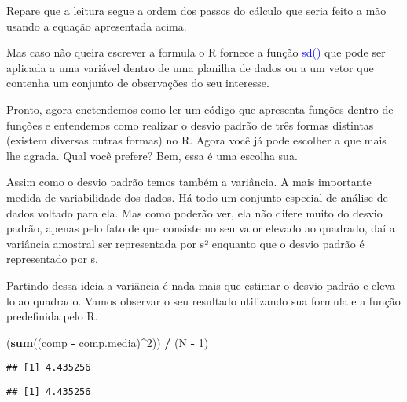 \documentclass[titlepage, oneside, openany, a4paper]{book}
\newenvironment{Shaded}{\begin{snugshade}}{\end{snugshade}}
\newcommand{\DecValTok}[1]{\textcolor[rgb]{0.00,0.00,0.81}{#1}}
\newcommand{\KeywordTok}[1]{\textcolor[rgb]{0.13,0.29,0.53}{\textbf{#1}}}
\newcommand{\NormalTok}[1]{#1}
\newcommand{\OperatorTok}[1]{\textcolor[rgb]{0.81,0.36,0.00}{\textbf{#1}}}
\newcommand{\StringTok}[1]{\textcolor[rgb]{0.31,0.60,0.02}{#1}}
\begin{document}
Repare que a leitura segue a ordem dos passos do cálculo que seria feito a mão usando a equação apresentada acima.

Mas caso não queira escrever a formula o R fornece a função \textcolor{blue}{sd()} que pode ser aplicada a uma variável dentro de uma planilha de dados ou a um vetor que contenha um conjunto de observações do seu interesse.

Pronto, agora enetendemos como ler um código que apresenta funções dentro de funções e entendemos como realizar o desvio padrão de três formas distintas (existem diversas outras formas) no R. Agora você já pode escolher a que mais lhe agrada. Qual você prefere? Bem, essa é uma escolha sua.

Assim como o desvio padrão temos também a variância. A mais importante medida de variabilidade dos dados. Há todo um conjunto especial de análise de dados voltado para ela. Mas como poderão ver, ela não difere muito do desvio padrão, apenas pelo fato de que consiste no seu valor elevado ao quadrado, daí a variância amostral ser representada por s² enquanto que o desvio padrão é representado por s.

Partindo dessa ideia a variância é nada mais que estimar o desvio padrão e eleva-lo ao quadrado. Vamos observar o seu resultado utilizando sua formula e a função predefinida pelo R.

\begin{Shaded}
\begin{Highlighting}[]
\NormalTok{(}\KeywordTok{sum}\NormalTok{((comp }\OperatorTok{-}\StringTok{ }\NormalTok{comp.media)}\OperatorTok{^}\DecValTok{2}\NormalTok{)) }\OperatorTok{/}\StringTok{ }\NormalTok{(N }\OperatorTok{-}\StringTok{ }\DecValTok{1}\NormalTok{)}
\end{Highlighting}
\end{Shaded}

\begin{verbatim}
## [1] 4.435256
\end{verbatim}

\begin{Shaded}
\end{Shaded}

\begin{verbatim}
## [1] 4.435256
\end{verbatim}
\end{document}
